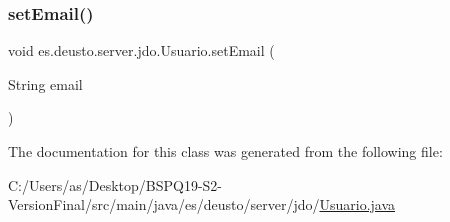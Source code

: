 \mbox{\label{classes_1_1deusto_1_1server_1_1jdo_1_1_usuario_a21f39f8557815c50c81baf11b13c666f}} 
\subsubsection{\texorpdfstring{setEmail()}{setEmail()}}
{\footnotesize\ttfamily void es.\+deusto.\+server.\+jdo.\+Usuario.\+set\+Email (\begin{DoxyParamCaption}\item[{String}]{email }\end{DoxyParamCaption})}



The documentation for this class was generated from the following file\+:\begin{DoxyCompactItemize}
\item 
C\+:/\+Users/as/\+Desktop/\+B\+S\+P\+Q19-\/\+S2-\/\+Version\+Final/src/main/java/es/deusto/server/jdo/\mbox{\hyperlink{_usuario_8java}{Usuario.\+java}}\end{DoxyCompactItemize}
